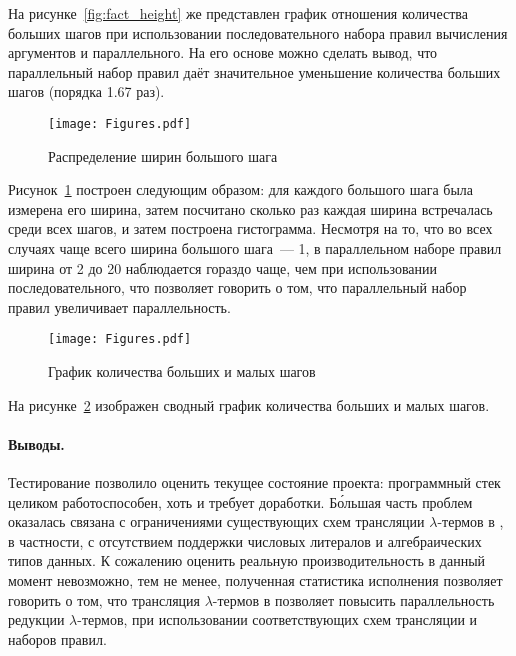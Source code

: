 На рисунке~\ref{fig:fact_height} же представлен график отношения количества больших шагов при использовании последовательного набора правил вычисления аргументов и параллельного.
На его основе можно сделать вывод, что параллельный набор правил даёт значительное уменьшение количества больших шагов (порядка 1.67 раз).

\begin{figure}
    \begin{center}
        \texttt{[image: Figures.pdf]}
    \end{center}
    \caption{Распределение ширин большого шага}
    \label{fig:fact_distr}
\end{figure}

Рисунок~\ref{fig:fact_distr} построен следующим образом: для каждого большого шага была измерена его ширина, затем посчитано сколько раз каждая ширина встречалась среди всех шагов, и затем построена гистограмма.
Несмотря на то, что во всех случаях чаще всего ширина большого шага~--- 1, в параллельном наборе правил ширина от 2 до 20 наблюдается гораздо чаще, чем при использовании последовательного, что позволяет говорить о том, что параллельный набор правил увеличивает параллельность.

\begin{figure}
    \begin{center}
        \texttt{[image: Figures.pdf]}
    \end{center}
    \caption{График количества больших и малых шагов}
    \label{fig:fact_red}
\end{figure}

На рисунке~\ref{fig:fact_red} изображен сводный график количества больших и малых шагов.

\paragraph{Выводы.}

Тестирование позволило оценить текущее состояние проекта: программный стек целиком работоспособен, хоть и требует доработки.
Б\'ольшая часть проблем оказалась связана с ограничениями существующих схем трансляции $\lambda$-термов в \INs{}, в частности, с отсутствием поддержки числовых литералов и алгебраических типов данных.
К сожалению оценить реальную производительность в данный момент невозможно, тем не менее, полученная статистика исполнения позволяет говорить о том, что трансляция $\lambda$-термов в \INs{} позволяет повысить параллельность редукции $\lambda$-термов, при использовании соответствующих схем трансляции и наборов правил.

